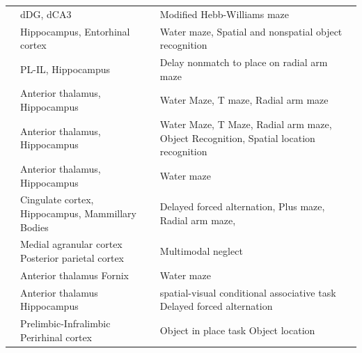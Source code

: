 \documentclass[doc, longtable]{apa6}
\begin{document}
\begin{landscape}
\begin{longtable}{p{8cm}p{5cm}p{8cm}}
\cite{jerman2006disconnection} & dDG, \newline dCA3 & Modified Hebb-Williams maze\\[20pt]
\cite{parron2006cooperation} & Hippocampus, \newline Entorhinal cortex & Water maze, \newline Spatial and nonspatial object recognition\\[20pt]
\cite{Lee2003} & PL-IL, \newline Hippocampus & Delay nonmatch to place on radial arm maze\\[20pt]
\cite{Warburton2001a} & Anterior thalamus, \newline Hippocampus & Water Maze, \newline T maze, Radial arm maze\\[20pt]
\cite{Warburton2000a} &Anterior thalamus, \newline Hippocampus & Water Maze, \newline T Maze, \newline Radial arm maze, \newline Object Recognition, \newline Spatial location recognition\\[20pt]
\cite{warburton1999does} & Anterior thalamus, \newline Hippocampus & Water maze\\[20pt]
\cite{neave1997evidence} & Cingulate cortex, \newline Hippocampus, \newline Mammillary Bodies & Delayed forced alternation, \newline Plus maze, \newline Radial arm maze, \\[20pt]
\cite{burcham1997disconnection} & Medial agranular cortex  \newline Posterior parietal cortex & Multimodal neglect\\[20pt]
\cite{warburton1998differential} & Anterior thalamus \newline Fornix & Water maze \\[20pt]
\cite{henry2004spatial} & Anterior thalamus \newline Hippocampus & spatial-visual conditional associative task \newline Delayed forced alternation\\[20pt]
\cite{barker2007recognition} & Prelimbic-Infralimbic \newline Perirhinal cortex & Object in place task \newline Object location\\[20pt]

\end{longtable}
\end{landscape}
\end{document}
